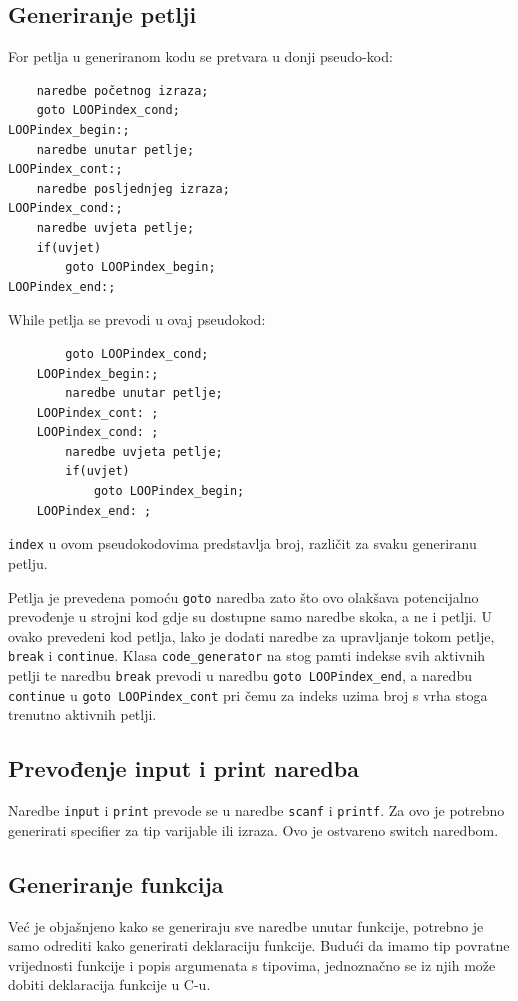 \documentclass[times, utf8, zavrsni]{fer}
\begin{document}
\subsection{Generiranje petlji}
For petlja u generiranom kodu se pretvara u donji pseudo-kod:
\begin{verbatim}
    naredbe početnog izraza;
    goto LOOPindex_cond;
LOOPindex_begin:;
    naredbe unutar petlje;
LOOPindex_cont:;
    naredbe posljednjeg izraza;
LOOPindex_cond:;
    naredbe uvjeta petlje;
    if(uvjet)
        goto LOOPindex_begin;
LOOPindex_end:;
\end{verbatim}

While petlja se prevodi u ovaj pseudokod:
\begin{verbatim}
        goto LOOPindex_cond;
    LOOPindex_begin:;
        naredbe unutar petlje;
    LOOPindex_cont: ;
    LOOPindex_cond: ;
        naredbe uvjeta petlje;
        if(uvjet)
            goto LOOPindex_begin;
    LOOPindex_end: ;
\end{verbatim}

\verb|index| u ovom pseudokodovima predstavlja broj, različit za svaku generiranu petlju.

Petlja je prevedena pomoću \verb|goto| naredba zato što ovo olakšava potencijalno prevođenje u strojni kod
gdje su dostupne samo naredbe skoka, a ne i petlji.
U ovako prevedeni kod petlja, lako je dodati naredbe za upravljanje tokom petlje, \verb|break| i \verb|continue|.
Klasa \verb|code_generator| na stog pamti indekse svih aktivnih petlji te naredbu \verb|break| prevodi u naredbu
\verb|goto LOOPindex_end|, a naredbu \verb|continue| u \verb|goto LOOPindex_cont| pri čemu za indeks uzima broj
s vrha stoga trenutno aktivnih petlji.

\subsection{Prevođenje input i print naredba}
Naredbe \verb|input| i \verb|print| prevode se u naredbe \verb|scanf| i \verb|printf|. Za ovo je potrebno generirati
specifier za tip varijable ili izraza. Ovo je ostvareno switch naredbom.

\subsection{Generiranje funkcija}
Već je objašnjeno kako se generiraju sve naredbe unutar funkcije, potrebno je samo odrediti
kako generirati deklaraciju funkcije. Budući da imamo tip povratne vrijednosti funkcije i popis
argumenata s tipovima, jednoznačno se iz njih može dobiti deklaracija funkcije u C-u.
\end{document}
